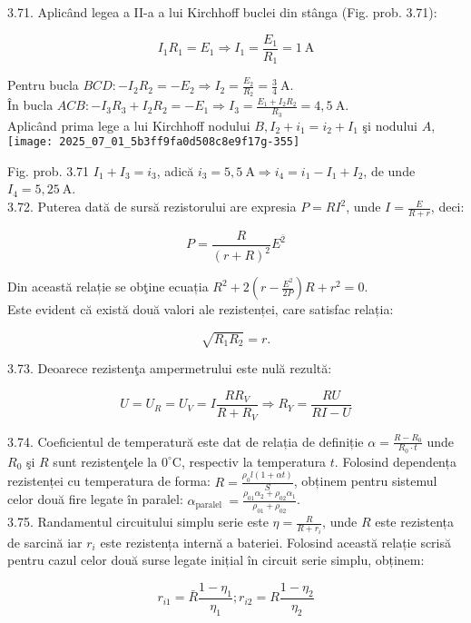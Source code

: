 3.71. Aplicând legea a II-a a lui Kirchhoff buclei din stânga (Fig. prob. 3.71):

$$
I_{1} R_{1}=E_{1} \Rightarrow I_{1}=\frac{E_{1}}{R_{1}}=1 \mathrm{~A}
$$

Pentru bucla $B C D:-I_{2} R_{2}=-E_{2} \Rightarrow I_{2}=\frac{E_{2}}{R_{2}}=\frac{3}{4} \mathrm{~A}$.\\
În bucla $A C B:-I_{3} R_{3}+I_{2} R_{2}=-E_{1} \Rightarrow I_{3}=\frac{E_{1}+I_{2} R_{2}}{R_{3}}=4,5 \mathrm{~A}$.\\
Aplicând prima lege a lui Kirchhoff nodului $B, I_{2}+i_{1}=i_{2}+I_{1}$ şi nodului $A$,\\
\texttt{[image: 2025\_07\_01\_5b3ff9fa0d508c8e9f17g-355]}

Fig. prob. 3.71 $I_{1}+I_{3}=i_{3}$, adică $i_{3}=5,5 \mathrm{~A} \Rightarrow i_{4}=i_{1}-I_{1}+I_{2}$, de unde $I_{4}=5,25 \mathrm{~A}$.\\
3.72. Puterea dată de sursă rezistorului are expresia $P=R I^{2}$, unde $I=\frac{E}{R+r}$, deci:

$$
P=\frac{R}{(r+R)^{2}} E^{\overline{2}}
$$

Din această relație se obţine ecuația $R^{2}+2\left(r-\frac{E^{2}}{2 P}\right) R+r^{2}=0$.\\
Este evident că există două valori ale rezistenței, care satisfac relația:

$$
\sqrt{R_{1} R_{2}}=r .
$$

3.73. Deoarece rezistenţa ampermetrului este nulă rezultă:

$$
U=U_{R}=U_{V}=I \frac{R R_{V}}{R+R_{V}} \Rightarrow R_{Y}=\frac{R U}{R I-U}
$$

3.74. Coeficientul de temperatură este dat de relația de definiție $\alpha=\frac{R-R_{0}}{R_{0} \cdot t}$ unde $R_{0}$ şi $R$ sunt rezistenţele la $0^{\circ} \mathrm{C}$, respectiv la temperatura $t$. Folosind dependența rezistenței cu temperatura de forma: $R=\frac{\rho_{0} l(1+\alpha t)}{S}$, obținem pentru sistemul celor două fire legate în paralel: $\alpha_{\text {paralel }}=\frac{\rho_{01} \alpha_{2}+\rho_{02} \alpha_{1}}{\rho_{01}+\rho_{02}}$.\\
3.75. Randamentul circuitului simplu serie este $\eta=\frac{R}{R+r_{i}}$, unde $R$ este rezistența de sarcină iar $r_{i}$ este rezistența internă a bateriei. Folosind această relație scrisă pentru cazul celor două surse legate inițial în circuit serie simplu, obținem:

$$
r_{i 1}=\bar{R} \frac{1-\eta_{1}}{\eta_{1}} ; r_{i 2}=R \frac{1-\eta_{2}}{\eta_{2}}
$$

